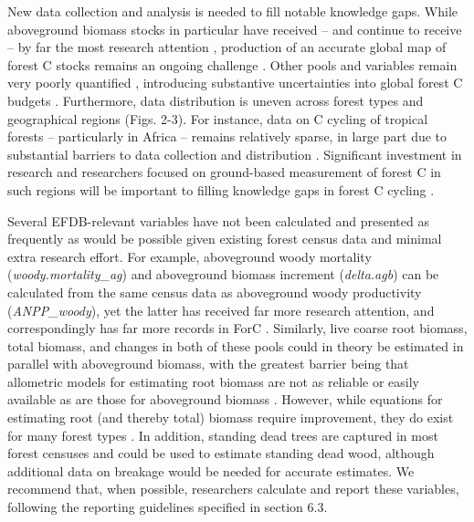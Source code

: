 \documentclass[, manuscript]{copernicus}
\begin{document}
New data collection and analysis is needed to fill notable knowledge
gaps. While aboveground biomass stocks in particular have received --
and continue to receive -- by far the most research attention
\citep[Table
2,][]{anderson-teixeira_carbon_2021, dubayah_global_2020, quegan_european_2019, nisar_nasaisro_2018},
production of an accurate global map of forest C stocks remains an
ongoing challenge \citep{araza_decade_2023}. Other pools and variables
remain very poorly quantified \citep[Table
2,][]{anderson-teixeira_carbon_2021}, introducing substantive
uncertainties into global forest C budgets
\citep{pan_large_2011, harris_global_2021}. Furthermore, data
distribution is uneven across forest types and geographical regions
(Figs. 2-3). For instance, data on C cycling of tropical forests --
particularly in Africa -- remains relatively sparse, in large part due
to substantial barriers to data collection and distribution
\citep{delima_making_2022}. Significant investment in research and
researchers focused on ground-based measurement of forest C in such
regions will be important to filling knowledge gaps in forest C cycling
\citep{delima_making_2022, araza_decade_2023, labrière_forest_2023}.

Several EFDB-relevant variables have not been calculated and presented
as frequently as would be possible given existing forest census data and
minimal extra research effort. For example, aboveground woody mortality
(\emph{woody.mortality\_ag}) and aboveground biomass increment
(\emph{delta.agb}) can be calculated from the same census data as
aboveground woody productivity (\emph{ANPP\_woody}), yet the latter has
received far more research attention, and correspondingly has far more
records in ForC \citetext{\citealp[Table
2,][]{anderson-teixeira_carbon_2021}; \citealp[but
see][]{piponiot_distribution_2022}}. Similarly, live coarse root
biomass, total biomass, and changes in both of these pools could in
theory be estimated in parallel with aboveground biomass, with the
greatest barrier being that allometric models for estimating root
biomass are not as reliable or easily available as are those for
aboveground biomass
\citep{chave_improved_2014, rejou-mechain_biomass_2017, gonzalez-akre_allodb_2022}.
However, while equations for estimating root (and thereby total) biomass
require improvement, they do exist for many forest types
\citep[e.g.,][]{brassard_coarse_2011, chojnacky_updated_2014, waring_overlooking_2017}.
In addition, standing dead trees are captured in most forest censuses
and could be used to estimate standing dead wood, although additional
data on breakage would be needed for accurate estimates. We recommend
that, when possible, researchers calculate and report these variables,
following the reporting guidelines specified in section 6.3.
\end{document}
